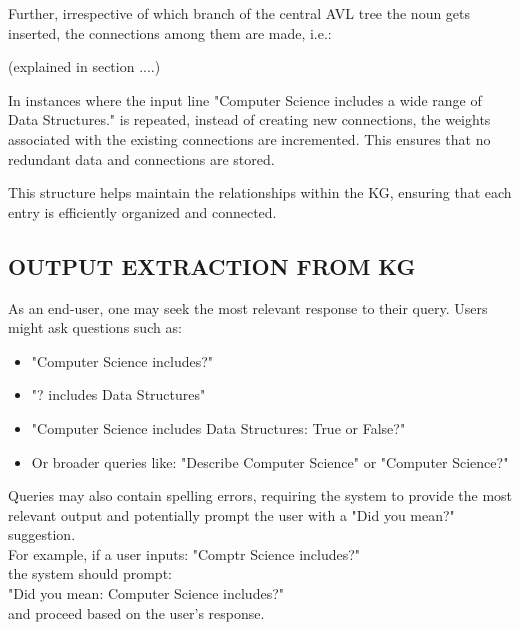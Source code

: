 \documentclass[conference]{IEEEtran}
\begin{document}
Further, irrespective of which branch of the central AVL tree the noun gets inserted, 
the connections among them are made, i.e.:


(explained in section ....)

In instances where the input line "Computer Science includes a wide range of Data Structures." is 
repeated, instead of creating new connections, the weights associated with the existing connections 
are incremented. This ensures that no redundant data and connections are stored.

This structure helps maintain the relationships within the KG, 
ensuring that each entry is efficiently organized and connected.


\subsection{OUTPUT EXTRACTION FROM KG}

As an end-user, one may seek the most relevant response to their query. Users might ask questions such as:
\begin{itemize}
    \item "Computer Science includes?"
    \item "? includes Data Structures"
    \item "Computer Science includes Data Structures: True or False?"
    \item Or broader queries like: "Describe Computer Science" or "Computer Science?"
\end{itemize}

Queries may also contain spelling errors, requiring the system to provide the most relevant output and potentially prompt the user with a "Did you mean?" suggestion.
\\
For example, if a user inputs: "Comptr Science includes?" 
\\the system should prompt:
\\
"Did you mean: Computer Science includes?" 
\\
and proceed based on the user's response.
\\
\end{document}
